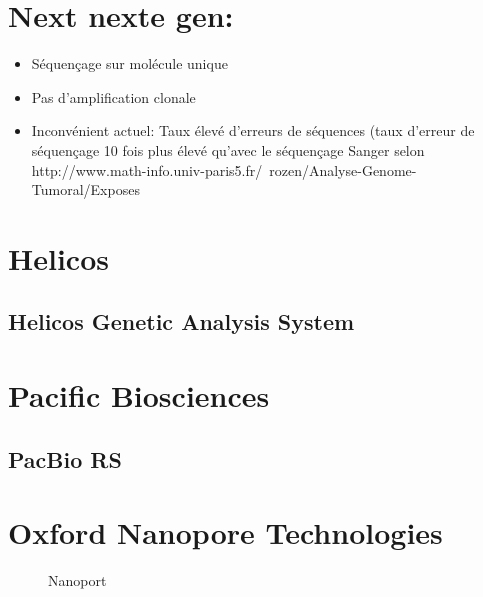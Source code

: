 \documentclass[a4paper]{article}
\begin{document}
\section{Next nexte gen:}

\begin{itemize}
\item Séquençage sur molécule unique
\item Pas d'amplification clonale
\item Inconvénient actuel: Taux élevé d'erreurs de séquences (taux d'erreur de séquençage 10 fois plus élevé qu'avec le séquençage Sanger selon http://www.math-info.univ-paris5.fr/~rozen/Analyse-Genome-Tumoral/Exposes%
\end{itemize}

\section{Helicos}

\subsection{Helicos Genetic Analysis System}

\section{Pacific Biosciences}

\subsection{PacBio RS}

\section{Oxford Nanopore Technologies}


\begin{figure}[!h]
\caption{Nanoport}
\end{figure}
\end{document}
